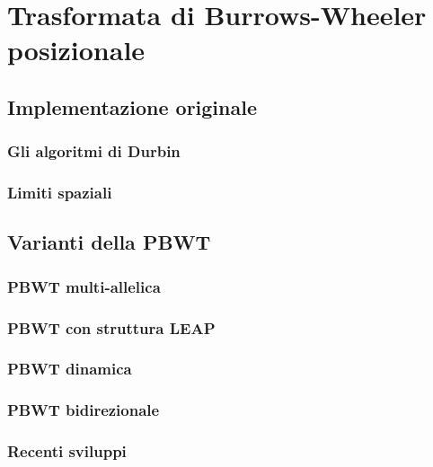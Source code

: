 \section{Trasformata di Burrows-Wheeler posizionale}
\subsection{Implementazione originale}
\subsubsection{Gli algoritmi di Durbin}
\subsubsection{Limiti spaziali}
\subsection{Varianti della PBWT}
\subsubsection{PBWT multi-allelica}
\subsubsection{PBWT con struttura LEAP}
\subsubsection{PBWT dinamica}
\subsubsection{PBWT bidirezionale}
\subsubsection{Recenti sviluppi}